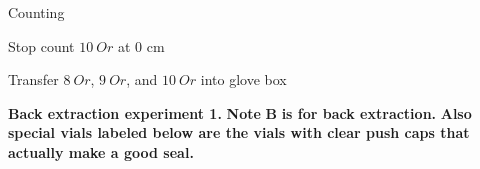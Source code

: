 \documentclass[idxtotoc,hyperref,openany,oneside]{labbook} %
\newcommand{\cmark}{\ding{51}}%
\newcommand{\done}{\rlap{$\square$}{\raisebox{2pt}{\large\hspace{1pt}\cmark}}%
  \hspace{-2.5pt}}
\begin{document}



Counting

\begin{todolist}
\item[\done]{Stop count $\boxed{10\ Or}$ at 0 cm}
\item[\done]{Transfer $\boxed{8\ Or}$, $\boxed{9 \ Or}$, and $\boxed{10\ Or}$
  into glove box}
\end{todolist}

\textbf{Back extraction experiment 1.}
\textbf{Note }$\bm{\boxed{B}}$\textbf{ is for back extraction.}
\textbf{Also special vials labeled below are the vials with clear push caps
that actually make a good seal.}
\end{document}
